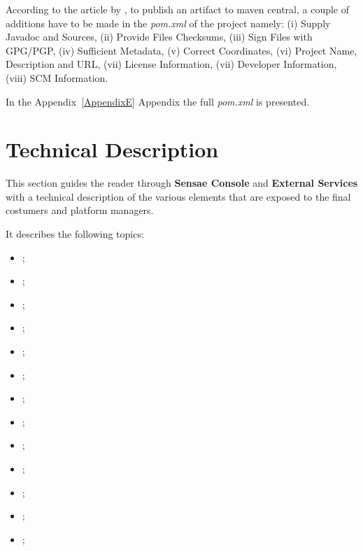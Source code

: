 According to the article  by \cite{centralreq}, to publish an artifact to maven central, a couple of additions have to be made in the \textit{pom.xml} of the project namely: (i) Supply Javadoc and Sources, (ii) Provide Files Checksums, (iii) Sign Files with GPG/PGP, (iv) Sufficient Metadata, (v) Correct Coordinates, (vi) Project Name, Description and URL, (vii) License Information, (vii) Developer Information, (viii) SCM Information.

In the Appendix~\ref{AppendixE} Appendix the full \textit{pom.xml} is presented.

\section{Technical Description}
\label{sec:implementation:description}

This section guides the reader through \textbf{Sensae Console} and \textbf{External Services} with a technical description of the various elements that are exposed to the final costumers and platform managers.

It describes the following topics:

\begin{itemize}
    \item {};
    \item {};
    \item {};
    \item {};
    \item {};
    \item {};
    \item {};
    \item {};
    \item {};
    \item {};
    \item {};
    \item {};
    \item {};
\end{itemize}

